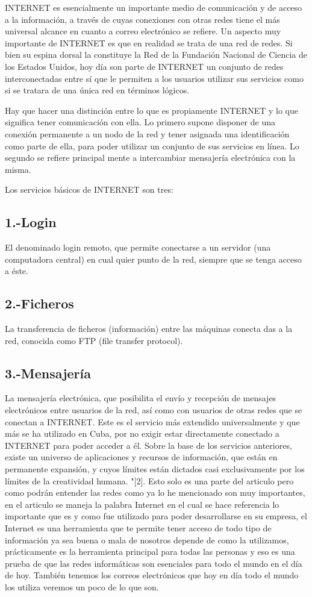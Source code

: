 \documentclass{bmcart}
\begin{document}
INTERNET es esencialmente un importante medio de comunicación y de acceso a la información, a través de cuyas conexiones con otras redes tiene el más universal alcance en cuanto a correo electrónico se refiere.
Un aspecto muy importante de INTERNET es que en realidad se trata de una red de redes. Si bien su espina dorsal la constituye la Red de la Fundación Nacional de Ciencia de los Estados Unidos, hoy día son parte de INTERNET un conjunto de redes interconectadas entre sí que le permiten a los usuarios utilizar sus servicios como si se tratara de una única red en términos lógicos.

Hay que hacer una distinción entre lo que es propiamente INTERNET y lo que significa tener comunicación con ella. Lo primero supone disponer de una conexión permanente a un nodo de la red y tener asignada una identificación como parte de ella, para poder utilizar un conjunto de sus servicios en línea. Lo segundo se refiere principal mente a intercambiar mensajería electrónica con la misma.

Los servicios básicos de INTERNET son tres:
\subsection*{1.-Login}
El denominado login remoto, que permite conectarse a un servidor (una computadora central) en cual quier punto de la red, siempre que se tenga acceso a éste.
\subsection*{2.-Ficheros}
La transferencia de ficheros (información) entre las máquinas conecta das a la red, conocida como FTP (file transfer protocol).
\subsection*{3.-Mensajería}
La mensajería electrónica, que posibilita el envío y recepción de mensajes electrónicos entre usuarios de la red, así como con usuarios de otras redes que se conectan a INTERNET. Este es el servicio más extendido universalmente y que más se ha utilizado en Cuba, por no exigir estar directamente conectado a INTERNET para poder acceder a él.
Sobre la base de los servicios anteriores, existe un universo de aplicaciones y recursos de información, que están en permanente expansión, y cuyos límites están dictados casi exclusivamente por los límites de la creatividad humana. 
"[2].
Esto solo es una parte del articulo pero como podrán entender las redes como ya lo he mencionado son muy importantes, en el articulo se maneja la palabra Internet en el cual se hace referencia lo importante que es y como fue utilizado para poder desarrollarse en su empresa, el Internet es una herramienta que te permite tener acceso de todo tipo de información ya sea buena o mala de nosotros depende de como la utilizamos, prácticamente es la herramienta principal para todas las personas y eso es una prueba de que las redes informáticas son esenciales para todo el mundo en el día de hoy.
También tenemos los correos electrónicos que hoy en día todo el mundo los utiliza veremos un poco de lo que son.
\end{document}
